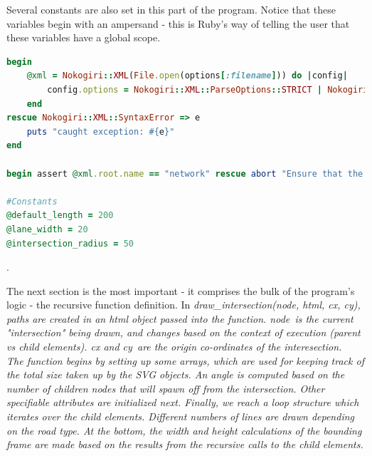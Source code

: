 \documentclass{article}
\begin{document}
Several constants are also set in this part of the program. Notice that these variables begin with an ampersand - this is Ruby's way of telling the user that these variables have a global scope.\\

\begin{lstlisting}[language=ruby]
begin
	@xml = Nokogiri::XML(File.open(options[:filename])) do |config|
		config.options = Nokogiri::XML::ParseOptions::STRICT | Nokogiri::XML::ParseOptions::NONET
	end
rescue Nokogiri::XML::SyntaxError => e
	puts "caught exception: #{e}"
end

begin assert @xml.root.name == "network" rescue abort "Ensure that the <network> tag is at the root" end

#Constants
@default_length = 200
@lane_width = 20
@intersection_radius = 50
\end{lstlisting}.

The next section is the most important - it comprises the bulk of the program's logic - the recursive function definition. In \em{draw\_intersection(node, html, cx, cy)}\em, paths are created in an html object passed into the function. \em{node}\em\ is the current "intersection" being drawn, and changes based on the context of execution (parent vs child elements). \em{cx and cy}\em\ are the origin co-ordinates of the interesection.\\

The function begins by setting up some arrays, which are used for keeping track of the total size taken up by the SVG objects. An angle is computed based on the number of children nodes that will spawn off from the intersection. Other specifiable attributes are initialized next. Finally, we reach a loop structure which iterates over the child elements. Different numbers of lines are drawn depending on the road type. At the bottom, the width and height calculations of the bounding frame are made based on the results from the recursive calls to the child elements.\\
\end{document}
